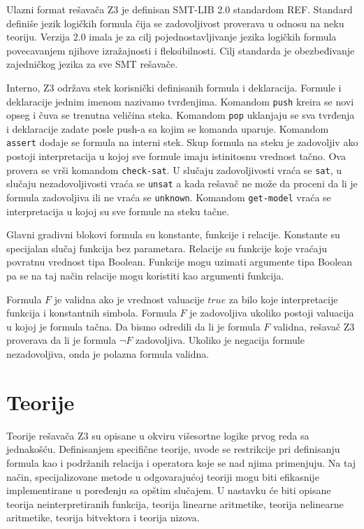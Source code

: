 \documentclass[12pt,oneside]{memoir}
\begin{document}
Ulazni format rešavača Z3 je definisan SMT-LIB 2.0 standardom REF. Standard definiše jezik logičkih formula čija se zadovoljivost proverava u odnosu na neku teoriju. Verzija 2.0 imala je za cilj pojednostavljivanje jezika logičkih formula povecavanjem njihove izražajnosti i fleksibilnosti. Cilj standarda je obezbeđivanje zajedničkog jezika za sve SMT rešavače. 
\par
Interno, Z3 održava stek korisnički definisanih formula i deklaracija. Formule i deklaracije jednim imenom nazivamo tvrđenjima. Komandom \texttt{push} kreira se novi opseg i čuva se trenutna veličina steka. Komandom \texttt{pop} uklanjaju se sva tvrđenja i deklaracije zadate posle push-a sa kojim se komanda uparuje. Komandom \texttt{assert} dodaje se formula na interni stek. Skup formula na steku je zadovoljiv ako postoji interpretacija u kojoj sve formule imaju istinitosnu vrednost tačno. Ova provera se vrši komandom \texttt{check-sat}. U slučaju zadovoljivosti vraća se \texttt{sat}, u slučaju nezadovoljivosti vraća se \texttt{unsat} a kada rešavač ne može da proceni da li je formula zadovoljiva ili ne vraća se \texttt{unknown}. Komandom \texttt{get-model} vraća se interpretacija u kojoj su sve formule na steku tačne. 
\par
Glavni gradivni blokovi formula su konstante, funkcije i relacije. Konstante su specijalan slučaj funkcija bez parametara. Relacije su funkcije koje vraćaju povratnu vrednost tipa Boolean. Funkcije mogu uzimati argumente tipa Boolean pa se na taj način relacije mogu koristiti kao argumenti funkcija.  


Formula $F$ je validna ako je vrednost valuacije $true$ za bilo koje interpretacije funkcija i konstantnih simbola. Formula $F$ je zadovoljiva ukoliko postoji valuacija u kojoj je formula tačna. Da bismo odredili da li je formula $F$ validna, rešavač Z3 proverava da li je formula $\lnot F$ zadovoljiva. Ukoliko je negacija formule nezadovoljiva, onda je polazna formula validna. 

 

\section{Teorije} \label{sec:num2}
Teorije rešavača Z3 su opisane u okviru višesortne logike prvog reda sa jednakošću.  Definisanjem specifične teorije, uvode se restrikcije pri definisanju formula kao i podržanih relacija i operatora koje se nad njima primenjuju. Na taj način, specijalizovane metode u odgovarajućoj teoriji mogu biti efikasnije implementirane u poređenju sa opštim slučajem. U nastavku će biti opisane teorija neinterpretiranih funkcija, teorija linearne aritmetike, teorija nelinearne aritmetike, teorija bitvektora i teorija nizova.
\end{document}
